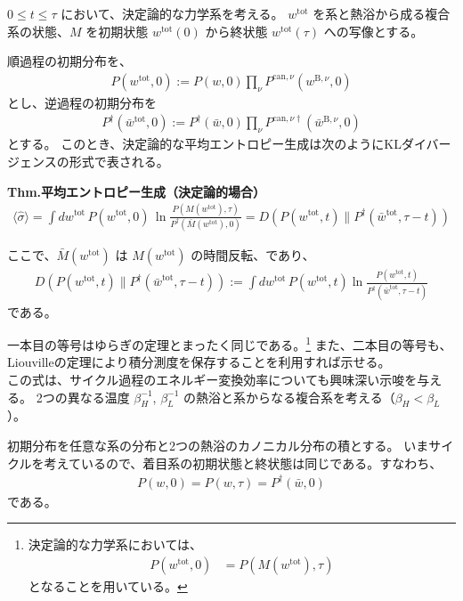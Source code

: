 \documentclass[a4paper,11pt]{jsarticle}
\numberwithin{equation}{section}
\begin{document}
$0 \leq t \leq \tau$ において、決定論的な力学系を考える。
$w^{\mathrm{tot}}$ を系と熱浴から成る複合系の状態、$M$ を初期状態 $w^{\mathrm{tot}}(0)$ から終状態 $w^{\mathrm{tot}}(\tau)$ への写像とする。

順過程の初期分布を、
\begin{align}
    P(w^{\mathrm{tot}}, 0) := P(w, 0) \prod_{\nu} P^{\mathrm{can}, \nu}(w^{\mathrm{B}, \nu}, 0)
\end{align}
とし、逆過程の初期分布を
\begin{align}
    P^{\dagger}(\bar{w}^{\mathrm{tot}}, 0) := P^{\dagger}(\bar{w},0) \prod_{\nu} P^{\mathrm{can}, \nu\dagger}(\bar{w}^{\mathrm{B}, \nu}, 0)
\end{align}
とする。
このとき、決定論的な平均エントロピー生成は次のようにKLダイバージェンスの形式で表される。
\begin{itembox}[l]{\textbf{Thm.平均エントロピー生成（決定論的場合）}}
    \begin{align}
\langle \hat{\sigma} \rangle
= \int dw^{\mathrm{tot}}\, P(w^{\mathrm{tot}}, 0)\, \ln \frac{P(M(w^{\mathrm{tot}}), \tau)}{P^{\dagger}(\bar{M}(w^{\mathrm{tot}}), 0)}
= D(P(w^{\mathrm{tot}}, t) \| P^{\dagger}(\bar{w}^{\mathrm{tot}}, \tau - t))
\end{align}

ここで、$\bar{M}(w^{\mathrm{tot}})$ は $M(w^{\mathrm{tot}})$ の時間反転、であり、
\begin{align}
D(P(w^{\mathrm{tot}}, t) \| P^{\dagger}(\bar{w}^{\mathrm{tot}}, \tau - t))
:= \int dw^{\mathrm{tot}}\, P(w^{\mathrm{tot}}, t) \ln \frac{P(w^{\mathrm{tot}}, t)}{P^{\dagger}(\bar{w}^{\mathrm{tot}}, \tau - t)}
\end{align}
である。
\end{itembox}
一本目の等号はゆらぎの定理とまったく同じである。\footnote{
    決定論的な力学系においては、
    \begin{align}
         P(w^{\mathrm{tot}}, 0) &= P(M(w^{\mathrm{tot}}), \tau) 
    \end{align}
    となることを用いている。

}
また、二本目の等号も、Liouvilleの定理により積分測度を保存することを利用すれば示せる。\\

この式は、サイクル過程のエネルギー変換効率についても興味深い示唆を与える。
2つの異なる温度 $\beta_H^{-1}$, $\beta_L^{-1}$ の熱浴と系からなる複合系を考える（$\beta_H < \beta_L$）。

初期分布を任意な系の分布と2つの熱浴のカノニカル分布の積とする。
いまサイクルを考えているので、着目系の初期状態と終状態は同じである。すなわち、
\begin{align}
    P(w, 0) = P(w, \tau) = P^{\dagger}(\bar{w}, 0) 
\end{align}
である。
\end{document}
